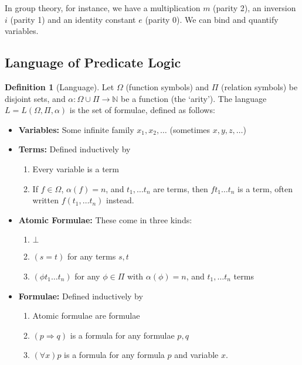 \documentclass{article}
\theoremstyle{definition}
\newtheorem{definition}{Definition}
\numberwithin{definition}{section}
\begin{document}
In group theory, for instance, we have a 
  multiplication $m$ (parity 2), an inversion $i$ (parity 1) and 
  an identity constant $e$ (parity 0). 
  We can bind and quantify variables. 

\subsection{Language of Predicate Logic}

\begin{definition}[Language]
Let $\Omega$  (function symbols) and $\Pi$ (relation symbols) be disjoint sets, 
  and $\alpha: \Omega \cup \Pi \to \mathbb{N}$ be a function (the `arity'). 
  The language $L = L(\Omega,\Pi,\alpha)$ is the set of formulae, defined as follows: 
\begin{itemize}

\item \textbf{Variables:} Some infinite family $x_{1},x_{2},\ldots$ 
    (sometimes $x,y,z,\ldots$)
    
\item \textbf{Terms:} Defined inductively by
	\begin{enumerate}[i]
	\item Every variable is a term
	\item If $f \in \Omega$, $\alpha(f) = n$, and $t_{1},\ldots t_{n}$ are terms, 
      then $ft_{1}\ldots t_{n}$ is a term, 
        often written $f(t_{1},\ldots t_{n})$ instead. 
	\end{enumerate}

\item \textbf{Atomic Formulae:} These come in three kinds:
	\begin{enumerate}[i]
	\item $\bot$
	\item $(s=t)$ for any terms $s,t$ 
	\item $(\phi t_{1}\ldots t_{n})$ for any $\phi \in \Pi$ 
        with $\alpha(\phi)=n$, and $t_{1},\ldots t_{n}$ terms
	\end{enumerate}

\item \textbf{Formulae:} Defined inductively by
	\begin{enumerate}[i]
	\item Atomic formulae are formulae
	\item $(p \Rightarrow q)$ is a formula for any formulae $p,q$
	\item $(\forall x) p$ is a formula for any formula $p$ and variable $x$. 
	\end{enumerate}

\end{itemize}
\end{definition}
\end{document}
